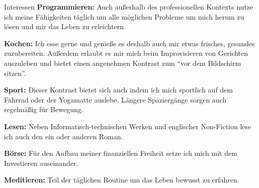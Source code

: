 \documentclass{cv}
\begin{document}
\begin{rSection}{Interessen}
  {\bf Programmieren:} Auch außerhalb des professionellen Kontexts nutze ich meine
Fähigkeiten täglich um alle möglichen Probleme um mich herum zu lösen und mir
das Leben zu erleichtern.

  {\bf Kochen:} Ich esse gerne und genieße es deshalb auch mir etwas frisches,
gesundes zuzubereiten. Außerdem erlaubt es mir mich beim Improvisieren von
Gerichten auszuleben und bietet einen angenehmen Kontrast zum ``vor dem
Bildschirm sitzen''.

  {\bf Sport:} Dieser Kontrast bietet sich auch indem ich mich sportlich auf dem
Fahrrad oder der Yogamatte auslebe. Längere Spaziergänge sorgen auch regelmäßig
für Bewegung.

  {\bf Lesen:} Neben Informatisch-technischen Werken und englischer
Non-Fiction lese ich auch den ein oder anderen Roman.

  {\bf Börse:} Für den Aufbau meiner finanziellen Freiheit setze ich mich mit dem
Investieren auseinander.

  {\bf Meditieren:} Teil der täglichen Routine um das Leben bewusst zu erfahren.
\end{rSection}
\end{document}
